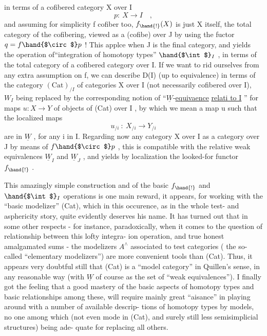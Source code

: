 
in terms of a cofibered category X over I
\[ p:\ X \longrightarrow I \quad , \]
and assuming for simplicity f cofiber too, $f_{\hand{!}}(X)$ is just X itself,
the total category of the cofibering, viewed as a (cofibe) 
over J by using the fuctor $q = f\hand{$\circ$}p$ ! This applce when J
is the final category, and yields the operation of``integration of
homotopy types'' $\hand{$\int$}_I$ , in terms of the total category of a  cofibered
category over I. If we want to rid ourselves from any extra assumption
on f, we can describe D(I) (up to equivalence) in terms of the category
$(\mathrm{Cat})_{/I}$ of categories X over I (not necessarily cofibered over I), $W_I$
being replaced by the corresponding notion of ``$\underline{W}$-\uline{equivaence}  \uline{relati
to I} '' for maps $u : X \to Y$ of objects of (Cat) over I , by which we mean
a map u such that the localized maps
\[ u_{/i} \ :\ X_{/i} \longrightarrow Y_{/i} \]
are in $\underline{W}$ , for any i in I. Regarding now any category X over I as a
category over J by means of $f\hand{$\circ$}p$ , this is  compatible with the relative
weak equivalences $\underline{W}_I$ and $\underline{W}_J$ , and yields by localization the looked-for
functor $f_{\hand{!}}$ .

This amazingly simple construction and  of the basic
$f_{\hand{!}}$ and $\hand{$\int$}_I$ operations is one main reward, it appears, for working with
the ``basic modelizer'' (Cat), which in this occurence, as in the whole
test- and asphericity story, quite evidently deserves his name. It has
turned out  that in some other respects - for instance, paradoxically,
when it comes to the question of relationship between this lofty integra-%
ion operation, and true honest amalgamated sums - the modelizers $A^{\wedge}$
associated to test categories  ( the so-called ``elementary modelizers'') are
more convenient tools than (Cat). Thus, it appears very doubtful still
that (Cat) is a ``model category'' in Quillen's sense, in any reasonable
way (with $\underline{W}$ of course as the set of ``weak equivalences''). I finally got
the feeling that  a good mastery of the basic aspects of homotopy types
and   basic relationships among these, will require mainly
great ``aisance'' in playing  around with a number of available descrip-%
tions of homotopy types by models, no one among which (not even  mode
in (Cat), and surely  still less  semisimplicial structures) being ade-%
quate for replacing all others.

